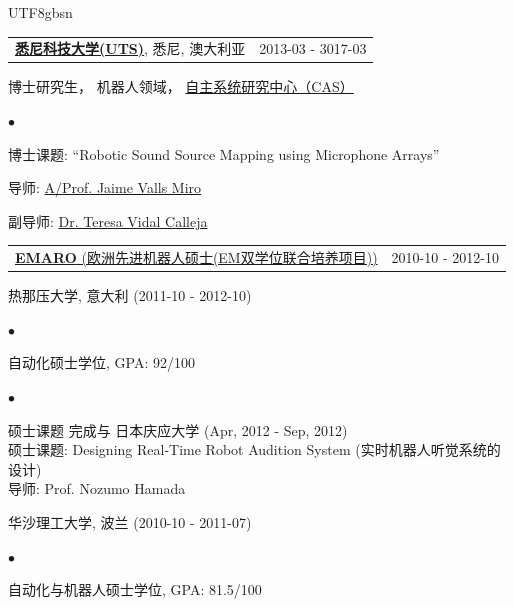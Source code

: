 \documentclass[margin,line]{res}
\newenvironment{list1}{
  \begin{list}{\ding{113}}{%
      \setlength{\itemsep}{0in}
      \setlength{\parsep}{0in} \setlength{\parskip}{0in}
      \setlength{\topsep}{0in} \setlength{\partopsep}{0in} 
      \setlength{\leftmargin}{0.17in}}}{\end{list}}
\newenvironment{list2}{
  \begin{list}{$\bullet$}{%
      \setlength{\itemsep}{0in}
      \setlength{\parsep}{0in} \setlength{\parskip}{0in}
      \setlength{\topsep}{0in} \setlength{\partopsep}{0in} 
      \setlength{\leftmargin}{0.2in}}}{\end{list}}
\begin{document}
\begin{CJK*}{UTF8}{gbsn}
\begin{resume}
\begin{tabularx}{\textwidth}{X r}
\href{http://www.uts.edu.au}{{\bf 悉尼科技大学(UTS)}}, 悉尼, 澳大利亚  &2013-03 - 3017-03\\
\end{tabularx}
\vspace*{-.1in}
\begin{list1}
\item[] 博士研究生， 机器人领域， \href{http://www.cas.uts.edu.au}{自主系统研究中心（CAS）}%
\begin{list2}
\vspace*{.05in}
\item 博士课题:  ``Robotic Sound Source Mapping using Microphone Arrays'' 
\item 导师: \href{http://www.uts.edu.au/staff/jaime.vallsmiro}{A/Prof. Jaime Valls Miro}
\item 副导师:  \href{http://www.uts.edu.au/staff/teresa.vidalcalleja}{Dr. Teresa Vidal Calleja}
\end{list2}
\end{list1}

\begin{tabularx}{\textwidth}{X r}
\href{http://emaro.irccyn.ec-nantes.fr/}{{\bf EMARO} (欧洲先进机器人硕士(EM双学位联合培养项目))} &2010-10 - 2012-10\\
\end{tabularx}
\vspace*{-.1in}
\begin{list1}
\item[] 热那压大学, 意大利 (2011-10 - 2012-10)
\begin{list2}
\vspace*{.05in}
\item 自动化硕士学位, GPA: 92/100
\end{list2}
\begin{list2}
\vspace*{.05in}
\item 硕士课题 完成与 日本庆应大学 (Apr, 2012 - Sep, 2012)\\
硕士课题: Designing Real-Time Robot Audition System (实时机器人听觉系统的设计)\\
导师: Prof. Nozumo Hamada
\end{list2}
\end{list1}
\begin{list1}
\item[] 华沙理工大学, 波兰 (2010-10 - 2011-07)
\begin{list2}
\vspace*{.05in}
\item 自动化与机器人硕士学位, GPA: 81.5/100
\end{list2}
\end{list1}


\end{resume}
\end{CJK*}
\end{document}
